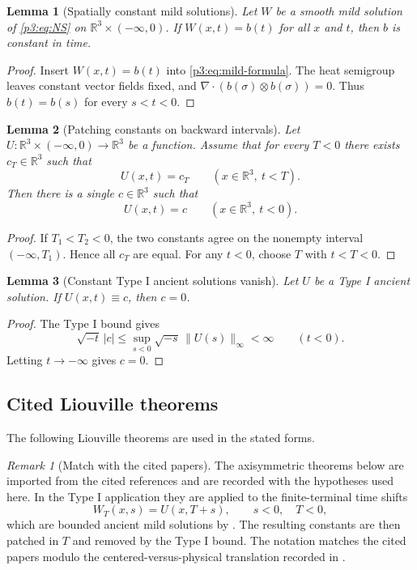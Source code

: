 \documentclass[11pt]{amsart}
\theoremstyle{plain}
\newtheorem{lemma}[lemma]{Lemma}
\theoremstyle{definition}
\theoremstyle{remark}
\newtheorem{remark}[remark]{Remark}
\numberwithin{equation}{section}
\begin{document}
\begin{lemma}[Spatially constant mild solutions]\label{p3:lem:spatial-constant-mild}
Let \(W\) be a smooth mild solution of \eqref{p3:eq:NS} on
\(\mathbb R^3\times(-\infty,0)\).  If \(W(x,t)=b(t)\) for all \(x\) and \(t\),
then \(b\) is constant in time.
\end{lemma}

\begin{proof}
Insert \(W(x,t)=b(t)\) into \eqref{p3:eq:mild-formula}.  The heat semigroup
leaves constant vector fields fixed, and
\(\nabla\cdot(b(\sigma)\otimes b(\sigma))=0\).  Thus
\(b(t)=b(s)\) for every \(s<t<0\).
\end{proof}

\begin{lemma}[Patching constants on backward intervals]
\label{p3:lem:patch-constants}
Let \(U:\mathbb R^3\times(-\infty,0)\to\mathbb R^3\) be a function.  Assume
that for every \(T<0\) there exists \(c_T\in\mathbb R^3\) such that
\[
   U(x,t)=c_T\qquad(x\in\mathbb R^3,\ t<T).
\]
Then there is a single \(c\in\mathbb R^3\) such that
\[
   U(x,t)=c\qquad(x\in\mathbb R^3,\ t<0).
\]
\end{lemma}

\begin{proof}
If \(T_1<T_2<0\), the two constants agree on the nonempty interval
\((-\infty,T_1)\).  Hence all \(c_T\) are equal.  For any \(t<0\), choose
\(T\) with \(t<T<0\).
\end{proof}

\begin{lemma}[Constant Type I ancient solutions vanish]
\label{p3:lem:galilean-typeI-zero}
Let \(U\) be a Type I ancient solution.  If \(U(x,t)\equiv c\), then
\(c=0\).
\end{lemma}

\begin{proof}
The Type I bound gives
\[
   \sqrt{-t}\,|c|
   \le
   \sup_{s<0}\sqrt{-s}\,\|U(s)\|_\infty<\infty
   \qquad(t<0).
\]
Letting \(t\to-\infty\) gives \(c=0\).
\end{proof}

\subsection{Cited Liouville theorems}

The following Liouville theorems are used in the stated forms.

\begin{remark}[Match with the cited papers]\label{p3:rem:axi-citations}
The axisymmetric theorems below are imported from the cited references and are
recorded with the hypotheses used here.  In the Type I application they are
applied to the finite-terminal time shifts
\[
   W_T(x,s)=U(x,T+s),\qquad s<0,\quad T<0,
\]
which are bounded ancient mild solutions by
.  The resulting constants are then patched in \(T\)
and removed by the Type I bound.  The notation matches the cited papers
modulo the centered-versus-physical translation recorded in
.
\end{remark}
\end{document}
